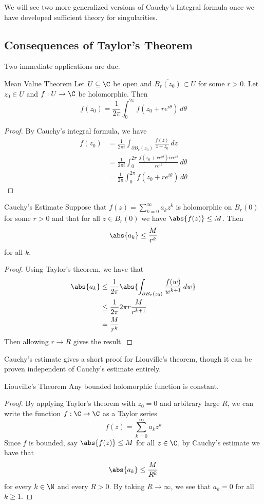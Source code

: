 \documentclass[a4paper]{article}
\begin{document}
We will see two more generalized versions of Cauchy's Integral formula once we have developed sufficient theory for singularities. 

\subsection{Consequences of Taylor's Theorem}
Two immediate applications are due. 

\begin{thm}{Mean Value Theorem}{} Let $U\subseteq\C$ be open and $\overline{B_r(z_0)}\subset U$ for some $r>0$. Let $z_0\in U$ and $f:U\to\C$ be holomorphic. Then $$f(z_0)=\frac{1}{2\pi}\int_0^{2\pi}f(z_0+re^{i\theta})\,d\theta$$ 
\begin{proof}
By Cauchy's integral formula, we have 
\begin{align*}
f(z_0)&=\frac{1}{2\pi i}\int_{\partial B_r(z_0)}\frac{f(z)}{z-z_0}\,dz\\
&=\frac{1}{2\pi i}\int_0^{2\pi}\frac{f(z_0+re^{i\theta})ire^{i\theta}}{re^{i\theta}}\,d\theta\\
&=\frac{1}{2\pi}\int_0^{2\pi}f(z_0+re^{i\theta})\,d\theta
\end{align*}
\end{proof}
\end{thm}

\begin{crl}{Cauchy's Estimate}{} Suppose that $f(z)=\sum_{k=0}^\infty a_kz^k$ is holomorphic on $B_r(0)$ for some $r>0$ and that for all $z\in B_r(0)$ we have $\abs{f(z)}\leq M$. Then $$\abs{a_k}\leq\frac{M}{r^k}$$ for all $k$. 
\begin{proof}
Using Taylor's theorem, we have that 
\begin{align*}
\abs{a_k}&\leq\frac{1}{2\pi}\abs{\int_{\partial B_r(z_0)}\frac{f(w)}{w^{k+1}}\,dw}\\
&\leq\frac{1}{2\pi}2\pi r\frac{M}{r^{k+1}}\\
&=\frac{M}{r^k}
\end{align*}
Then allowing $r\to R$ gives the result. 
\end{proof}
\end{crl}

Cauchy's estimate gives a short proof for Liouville's theorem, though it can be proven independent of Cauchy's estimate entirely. 

\begin{crl}{Liouville's Theorem}{} Any bounded holomorphic function is constant. 
\begin{proof}
By applying Taylor's theorem with $z_0=0$ and arbitrary large $R$, we can write the function $f:\C\to\C$ as a Taylor series $$f(z)=\sum_{k=0}^\infty a_kz^k$$ Since $f$ is bounded, say $\abs{f(z)}\leq M$ for all $z\in\C$, by Cauchy's estimate we have that $$\abs{a_k}\leq\frac{M}{R^k}$$ for every $k\in\N$ and every $R>0$. By taking $R\to\infty$, we see that $a_k=0$ for all $k\geq 1$. 
\end{proof}
\end{crl}
\end{document}
